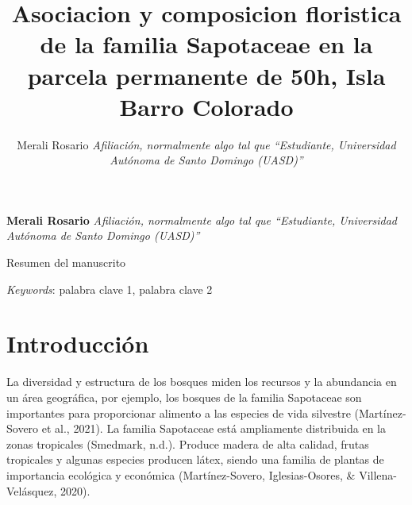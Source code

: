 \documentclass[11pt,]{article}
\title{Asociacion y composicion floristica de la familia Sapotaceae en la
parcela permanente de 50h, Isla Barro Colorado  }
\author{\Large Merali Rosario\vspace{0.05in} \newline\normalsize\emph{Afiliación, normalmente algo tal que ``Estudiante, Universidad Autónoma
de Santo Domingo (UASD)''}  }
\date{}
\newcommand*{\authorfont}{\fontfamily{phv}\selectfont}
\renewenvironment{abstract}
 {{%
    \setlength{\leftmargin}{0mm}
    \setlength{\rightmargin}{\leftmargin}%
  }%
  \relax}
 {\endlist}
\begin{document}
	
%

{%
\setlength{\parindent}{0pt}
\thispagestyle{plain}
{\fontsize{18}{20}\selectfont\raggedright 
\maketitle  %

}

{
   \vskip 13.5pt\relax \normalsize\fontsize{11}{12} 
\textbf{\authorfont Merali Rosario} \hskip 15pt \emph{\small Afiliación, normalmente algo tal que ``Estudiante, Universidad Autónoma
de Santo Domingo (UASD)''}   

}

}








\begin{abstract}

    \hbox{\vrule height .2pt width 39.14pc}

    \vskip 8.5pt %

\noindent Resumen del manuscrito


\vskip 8.5pt \noindent \emph{Keywords}: palabra clave 1, palabra clave 2 \par

    \hbox{\vrule height .2pt width 39.14pc}



\end{abstract}


\vskip 6.5pt


\noindent  \section{Introducción}\label{introducciuxf3n}

La diversidad y estructura de los bosques miden los recursos y la
abundancia en un área geográfica, por ejemplo, los bosques de la familia
Sapotaceae son importantes para proporcionar alimento a las especies de
vida silvestre (Martínez-Sovero et al., 2021). La familia Sapotaceae
está ampliamente distribuida en la zonas tropicales (Smedmark, n.d.).
Produce madera de alta calidad, frutas tropicales y algunas especies
producen látex, siendo una familia de plantas de importancia ecológica y
económica (Martínez-Sovero, Iglesias-Osores, \& Villena-Velásquez,
2020).
\end{document}
